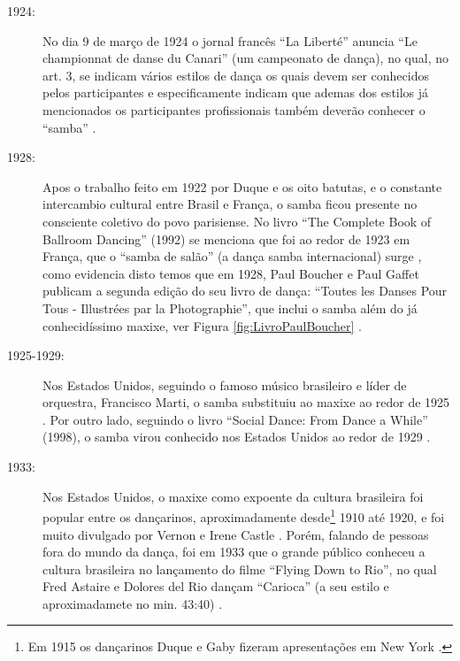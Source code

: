 \begin{description}
\item[1924:] No dia 9 de março de 1924 o jornal francês ``La Liberté''
anuncia ``Le championnat de danse du Canari'' (um campeonato de dança),
no qual, no art. 3, se indicam vários estilos de dança os quais devem ser conhecidos pelos participantes 
e especificamente indicam que ademas dos estilos já mencionados
os participantes profissionais também deverão conhecer o ``samba'' \cite[pp. 2]{LaLiberte:1924:Marco:9}.

\item[1928:] Apos o trabalho feito em 1922 por Duque e os oito batutas, e o constante intercambio cultural entre Brasil e França, 
o samba ficou presente no consciente coletivo do povo parisiense.
No livro ``The Complete Book of Ballroom Dancing'' (1992) se menciona que foi ao redor de 1923
em França, que o ``samba de salão'' (a dança samba internacional) surge \cite[pp. 45]{stephenson1992complete},
como evidencia disto temos que em 1928, 
Paul Boucher e Paul Gaffet publicam a segunda edição do seu livro de dança:
``Toutes les Danses Pour Tous - Illustrées par la Photographie'',
que inclui o samba além do já conhecidíssimo maxixe, ver Figura \ref{fig:LivroPaulBoucher} \cite{boucher1928toutes} \cite[pp. 2210]{library1929catalog}.

\item[1925-1929:] Nos Estados Unidos, seguindo o famoso músico brasileiro e líder de orquestra, 
Francisco Marti,
o samba substituiu ao maxixe ao redor de 1925 \cite[pp. 238]{hostetler1942walk}.
Por outro lado, seguindo o livro ``Social Dance: From Dance a While'' (1998),
o samba virou conhecido nos Estados Unidos ao redor de 1929
\cite[pp. 125]{harris1998social}.

\item[1933:] Nos Estados Unidos, o maxixe como expoente da cultura brasileira foi popular 
entre os dançarinos, aproximadamente desde\footnote{Em 
1915 os dançarinos Duque e Gaby fizeram apresentações em New York \cite[pp. 45]{maxixe1915duqueEEUU:1}.} 1910
até 1920, e foi muito divulgado por Vernon e Irene Castle \cite[pp. 44]{stephenson1992complete}.
Porém, falando de pessoas fora do mundo da dança, 
foi em 1933 que o grande público conheceu a cultura brasileira no lançamento do filme
``Flying Down to Rio'',
no qual Fred Astaire e Dolores del Rio dançam ``Carioca'' (a seu estilo e aproximadamete no min. 43:40) \cite[pp. 297]{schwartz2004flying} \cite[pp. 1509]{library1961catalog} \cite{simposio2007}.


\end{description}
